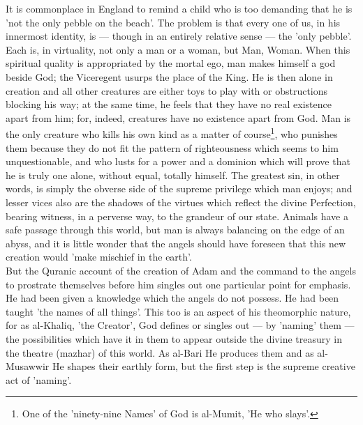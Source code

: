 \documentclass[11pt, b5paper, twoside]{book}
\begin{document}
It is commonplace in England to remind a child who is too demanding that he is 'not the only pebble 
on the beach'. The problem is that every one of us, in his innermost identity, is --- though in an 
entirely relative sense --- the 'only pebble'. Each is, in virtuality, not only a man or a woman, but 
Man, Woman. When this spiritual quality is appropriated by the mortal ego, man makes himself a god 
beside God; the Viceregent usurps the place of the King. He is then alone in creation and all other 
creatures are either toys to play with or obstructions blocking his way; at the same time, he feels 
that they have no real existence apart from him; for, indeed, creatures have no existence apart from 
God. Man is the only creature who kills his own kind as a matter of course\footnote{One of the 'ninety-nine Names' of God is al-Mumit, 'He who slays'.}, who punishes them 
because they do not fit the pattern of righteousness which seems to him unquestionable, and who lusts 
for a power and a dominion which will prove that he is truly one alone, without equal, totally 
himself. The greatest sin, in other words, is simply the obverse side of the supreme privilege which 
man enjoys; and lesser vices also are the shadows of the virtues which reflect the divine Perfection, 
bearing witness, in a perverse way, to the grandeur of our state. Animals have a safe passage through 
this world, but man is always balancing on the edge of an abyss, and it is little wonder that the 
angels should have foreseen that this new creation would 'make mischief in the earth'. \\

But the Quranic account of the creation of Adam and the command to the angels to prostrate themselves 
before him singles out one particular point for emphasis. He had been given a knowledge which the 
angels do not possess. He had been taught 'the names of all things'. This too is an aspect of his 
theomorphic nature, for as al-Khaliq, 'the Creator', God defines or singles out --- by 'naming' them --- 
the possibilities which have it in them to appear outside the divine treasury in the theatre (mazhar) 
of this world. As al-Bari He produces them and as al-Musawwir He shapes their earthly form, but the 
first step is the supreme creative act of 'naming'. \\
\end{document}
